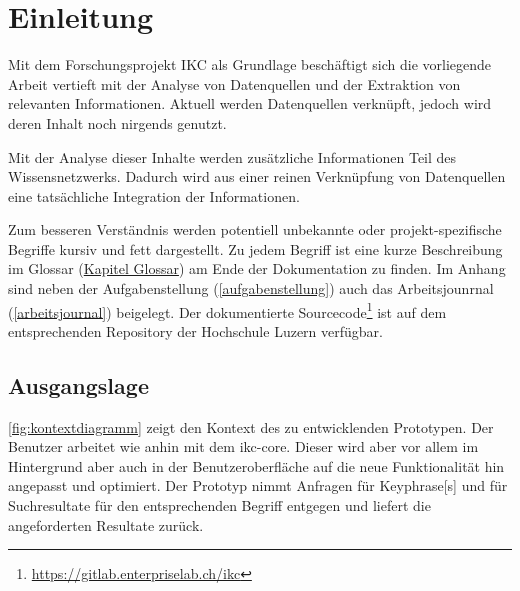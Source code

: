 

\chapter{Einleitung}



Mit dem Forschungsprojekt \gls{IKC} als Grundlage beschäftigt sich die vorliegende Arbeit vertieft mit der Analyse von Datenquellen und der Extraktion von relevanten Informationen. Aktuell werden Datenquellen verknüpft, jedoch wird deren Inhalt noch nirgends genutzt. 

Mit der Analyse dieser Inhalte werden zusätzliche Informationen Teil des Wissensnetzwerks. Dadurch wird aus einer reinen Verknüpfung von Datenquellen eine tatsächliche Integration der Informationen.



Zum besseren Verständnis werden potentiell unbekannte oder pro\-jekt-spezifische Begriffe kursiv und fett dargestellt. Zu jedem Begriff ist eine kurze Beschreibung im Glossar (\hyperref[glossar]{Kapitel Glossar}) am Ende der Dokumentation zu finden. Im Anhang sind neben der Aufgabenstellung (\autoref{aufgabenstellung}) auch das Arbeitsjounrnal (\autoref{arbeitsjournal}) beigelegt. Der dokumentierte Sourcecode\footnote{\url{https://gitlab.enterpriselab.ch/ikc}} ist auf dem entsprechenden Repository der Hochschule Luzern verfügbar.


\section{Ausgangslage}



\autoref{fig:kontextdiagramm} zeigt den Kontext des zu entwicklenden Prototypen. Der Benutzer arbeitet wie anhin mit dem \gls{ikc-core}. Dieser wird aber vor allem im Hintergrund aber auch in der Benutzeroberfläche auf die neue Funktionalität hin angepasst und optimiert. Der Prototyp nimmt Anfragen für \gls{Keyphrase}[s] und für Suchresultate für den entsprechenden Begriff entgegen und liefert die angeforderten Resultate zurück.

